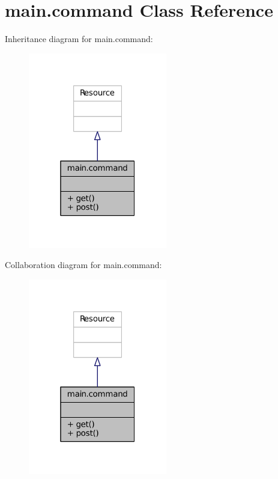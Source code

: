 \hypertarget{classmain_1_1command}{}\section{main.\+command Class Reference}
\label{classmain_1_1command}


Inheritance diagram for main.\+command\+:
\nopagebreak
\begin{figure}[H]
\begin{center}
\leavevmode
\includegraphics[width=172pt]{classmain_1_1command__inherit__graph}
\end{center}
\end{figure}


Collaboration diagram for main.\+command\+:
\nopagebreak
\begin{figure}[H]
\begin{center}
\leavevmode
\includegraphics[width=172pt]{classmain_1_1command__coll__graph}
\end{center}
\end{figure}
